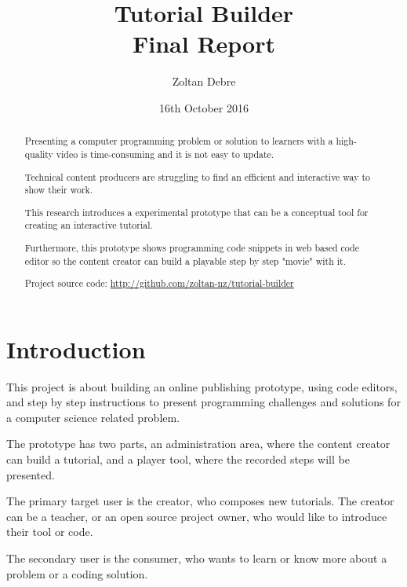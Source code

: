 \documentclass[11pt, a4paper, oneside, openright, medskipamount]{report}
\title{%
Tutorial Builder \\
\large Final Report}
\author{Zoltan Debre}
\date{16th October 2016}
\begin{document}
\frontmatter

\begin{abstract}

Presenting a computer programming problem or solution to learners with a high-quality video is time-consuming and it is not easy to update.

Technical content producers are struggling to find an efficient and interactive way to show their work.

This research introduces a experimental prototype that can be a conceptual tool for creating an interactive tutorial.

Furthermore, this prototype shows programming code snippets in web based code editor so the content creator can build a playable step by step "movie" with it.

Project source code: \url{http://github.com/zoltan-nz/tutorial-builder}

\end{abstract}



\maketitle

\tableofcontents


\mainmatter


\chapter{Introduction}

This project is about building an online publishing prototype, using code editors, and step by step instructions to present programming challenges and solutions for a computer science related problem.

The prototype has two parts, an administration area, where the content creator can build a tutorial, and a player tool, where the recorded steps will be presented.

The primary target user is the creator, who composes new tutorials. The creator can be a teacher, or an open source project owner, who would like to introduce their tool or code.

The secondary user is the consumer, who wants to learn or know more about a problem or a coding solution.
\end{document}
